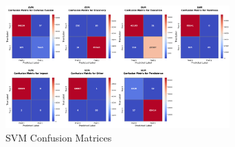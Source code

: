         \clearpage
    
        
        \begin{figure}[H]
        
            \centering
            
            \begin{minipage}{\textwidth}
                \centering
                \begin{minipage}[c]{\textwidth}
                    \centering
                    \includegraphics[width=0.77\textwidth]{../figures/plots/section2/SVM_normalized_confusion_matrix_test.png}
                    \caption{SVM Confusion Matrices}
                    \label{fig:svm_cm_base}
                \end{minipage}%
            \end{minipage}

            \vspace{0.5cm}  %
            

\end{figure}
